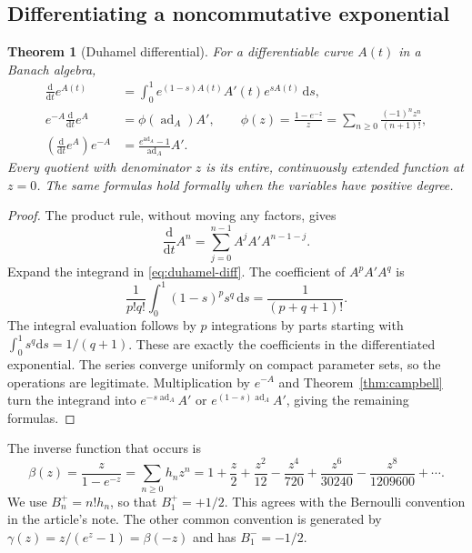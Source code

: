 \documentclass[11pt]{article}
\newtheorem{theorem}{Theorem}[section]
\theoremstyle{definition}
\theoremstyle{remark}
\newcommand{\dd}{\mathrm d}
\newcommand{\ad}{\operatorname{ad}}
\numberwithin{equation}{section}
\begin{document}
\subsection{Differentiating a noncommutative exponential}
\begin{theorem}[Duhamel differential]\label{thm:dexp}
For a differentiable curve $A(t)$ in a Banach algebra,
\begin{align}
 \frac{\dd}{\dd t}e^{A(t)}
 &=\int_0^1 e^{(1-s)A(t)}A'(t)e^{sA(t)}\,\dd s,\label{eq:duhamel-diff}\\
 e^{-A}\frac{\dd}{\dd t}e^A
 &=\phi(\ad_A)A',\qquad
 \phi(z)=\frac{1-e^{-z}}{z}
        =\sum_{n\geq0}\frac{(-1)^nz^n}{(n+1)!},\label{eq:leftdexp}\\
 \left(\frac{\dd}{\dd t}e^A\right)e^{-A}
 &=\frac{e^{\ad_A}-1}{\ad_A}A'.\label{eq:rightdexp}
\end{align}
Every quotient with denominator $z$ is its entire, continuously extended function at $z=0$. The same formulas hold formally when the variables have positive degree.
\end{theorem}
\begin{proof}
The product rule, without moving any factors, gives
\[
 \frac{\dd}{\dd t}A^n=\sum_{j=0}^{n-1}A^jA'A^{n-1-j}.
\]
Expand the integrand in \eqref{eq:duhamel-diff}. The coefficient of $A^pA'A^q$ is
\[
 \frac1{p!q!}\int_0^1(1-s)^ps^q\,\dd s
 =\frac1{(p+q+1)!}.
\]
The integral evaluation follows by $p$ integrations by parts starting with $\int_0^1s^q\dd s=1/(q+1)$. These are exactly the coefficients in the differentiated exponential. The series converge uniformly on compact parameter sets, so the operations are legitimate. Multiplication by $e^{-A}$ and Theorem~\ref{thm:campbell} turn the integrand into $e^{-s\ad_A}A'$ or $e^{(1-s)\ad_A}A'$, giving the remaining formulas.
\end{proof}

The inverse function that occurs is
\begin{equation}\label{eq:beta}
 \beta(z)=\frac{z}{1-e^{-z}}
 =\sum_{n\geq0}h_nz^n
 =1+\frac z2+\frac{z^2}{12}-\frac{z^4}{720}
       +\frac{z^6}{30240}-\frac{z^8}{1209600}+\cdots.
\end{equation}
We use $B_n^+=n!h_n$, so that $B_1^+=+1/2$. This agrees with the Bernoulli convention in the article's note. The other common convention is generated by
$\gamma(z)=z/(e^z-1)=\beta(-z)$ and has $B_1^-=-1/2$.
\end{document}
